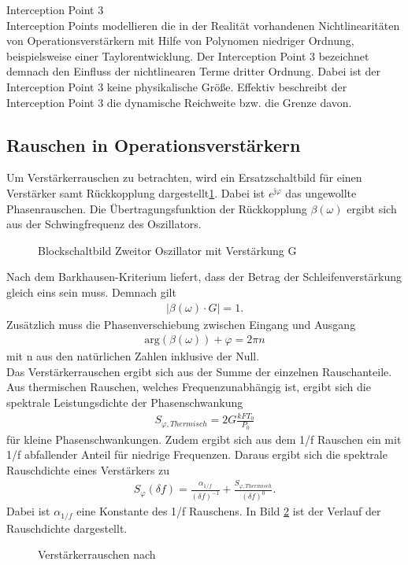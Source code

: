 \begin{description}
\item Interception Point 3 \\
Interception Points modellieren die in der Realität vorhandenen Nichtlinearitäten von Operationsverstärkern mit Hilfe von Polynomen niedriger Ordnung, beispielsweise einer Taylorentwicklung. Der Interception Point 3 bezeichnet demnach den Einfluss der nichtlinearen Terme dritter Ordnung. Dabei ist der Interception Point 3 keine physikalische Größe. Effektiv beschreibt der Interception Point 3 die dynamische Reichweite bzw. die Grenze davon. 
\end{description}
\subsection{Rauschen in Operationsverstärkern}
Um Verstärkerrauschen zu betrachten, wird ein Ersatzschaltbild für einen Verstärker samt Rückkopplung dargestellt\ref{fig:Verstaerkerrauschen_Block}. Dabei ist $e^{\text{j}\varphi}$ das ungewollte Phasenrauschen. Die Übertragungsfunktion der Rückkopplung $\beta(\omega)$ ergibt sich aus der Schwingfrequenz des Oszillators.
\begin{figure}[tbp]
  \centering
  
  \caption{Blockschaltbild Zweitor Oszillator mit Verstärkung G \cite{HFKompo}}
  \label{fig:Verstaerkerrauschen_Block}
\end{figure}
Nach dem Barkhausen-Kriterium\cite[S.134,135]{HFKompo} liefert, dass der Betrag der Schleifenverstärkung gleich eins sein muss. Demnach gilt
\begin{align}
\vert \beta ( \omega )\cdot G\vert = 1 .
\end{align}
Zusätzlich muss die Phasenverschiebung zwischen Eingang und Ausgang 
\begin{align}
\text{arg}\left( \beta ( \omega )\right) + \varphi = 2\pi n
\end{align}
mit n aus den natürlichen Zahlen inklusive der Null. \\
Das Verstärkerrauschen ergibt sich aus der Summe der einzelnen Rauschanteile. Aus thermischen Rauschen, welches Frequenzunabhängig ist, ergibt sich die spektrale Leistungsdichte der Phasenschwankung \cite{HFKompo} 
\begin{align}
S_{\varphi , Thermisch} = 2 G \frac{kFT_{0}}{P_{0}} 
\end{align} 
für kleine Phasenschwankungen. Zudem ergibt sich aus dem 1/f Rauschen ein mit 1/f abfallender Anteil für niedrige Frequenzen. Daraus ergibt sich die spektrale Rauschdichte eines Verstärkers zu
\begin{align}
S_{\varphi}(\delta f) = \frac{\alpha_{1/f}}{(\delta f)^{-1}} + \frac{S_{\varphi , Thermisch}}{(\delta f)^{0}}.
\end{align}
Dabei ist $\alpha_{1/f}$ eine Konstante des 1/f Rauschens. In Bild \ref{fig:Verstaerkerrauschen} ist der Verlauf der Rauschdichte dargestellt.
\begin{figure}[tbp]
  \centering
  
  \caption{Verstärkerrauschen nach \cite{HFKompo}}
  \label{fig:Verstaerkerrauschen}
\end{figure}
